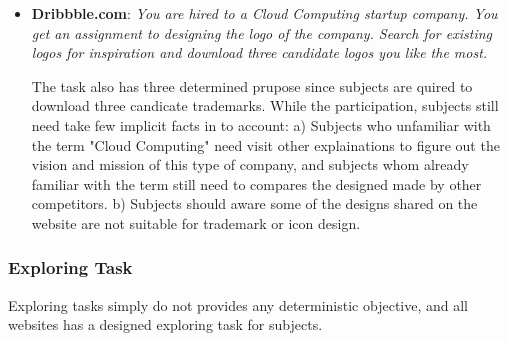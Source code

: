 \begin{itemize}
    \item \textbf{Dribbble.com}: \emph{You are hired to a Cloud Computing startup company. You get an assignment to 
        designing the logo of the company. Search for existing logos for inspiration and 
        download three candidate logos you like the most.}

        The task also has three determined prupose since subjects are quired to download three candicate trademarks.
        While the participation, subjects still need take few implicit facts in to account:
        a) Subjects who unfamiliar with the term "Cloud Computing" need visit other explainations to figure out
        the vision and mission of this type of company, and subjects whom already familiar with the term
        still need to compares the designed made by other competitors.
        b) Subjects should aware some of the designs shared on the website are not suitable for trademark or icon design.
\end{itemize}

\subsubsection{Exploring Task}

Exploring tasks simply do not provides any deterministic objective,
and all websites has a designed exploring task for subjects.

